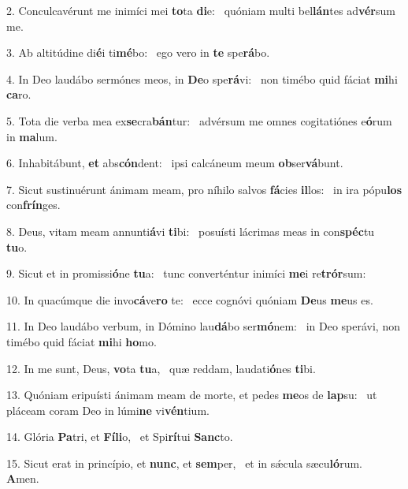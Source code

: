 2. Conculcavérunt me inimíci mei \textbf{to}ta \textbf{di}e: \ast\  quóniam multi bel\textbf{lán}tes ad\textbf{vér}sum me.\

3. Ab altitúdine di\textbf{é}i ti\textbf{mé}bo: \ast\  ego vero in \textbf{te} spe\textbf{rá}bo.\

4. In Deo laudábo sermónes meos, in \textbf{De}o spe\textbf{rá}vi: \ast\  non timébo quid fáciat \textbf{mi}hi \textbf{ca}ro.\

5. Tota die verba mea ex\textbf{se}cra\textbf{bán}tur: \ast\  advérsum me omnes cogitatiónes e\textbf{ó}rum in \textbf{ma}lum.\

6. Inhabitábunt, \textbf{et} abs\textbf{cón}dent: \ast\  ipsi calcáneum meum \textbf{ob}ser\textbf{vá}bunt.\

7. Sicut sustinuérunt ánimam meam, pro níhilo salvos \textbf{fá}cies \textbf{il}los: \ast\  in ira pópu\textbf{los} con\textbf{frín}ges.\

8. Deus, vitam meam annunti\textbf{á}vi \textbf{ti}bi: \ast\  posuísti lácrimas meas in con\textbf{spéc}tu \textbf{tu}o.\

9. Sicut et in promissi\textbf{ó}ne \textbf{tu}a: \ast\  tunc converténtur inimíci \textbf{me}i re\textbf{trór}sum:\

10. In quacúmque die invo\textbf{cá}ve\textbf{ro} te: \ast\  ecce cognóvi quóniam \textbf{De}us \textbf{me}us es.\

11. In Deo laudábo verbum, in Dómino lau\textbf{dá}bo ser\textbf{mó}nem: \ast\  in Deo sperávi, non timébo quid fáciat \textbf{mi}hi \textbf{ho}mo.\

12. In me sunt, Deus, \textbf{vo}ta \textbf{tu}a, \ast\  quæ reddam, laudati\textbf{ó}nes \textbf{ti}bi.\

13. Quóniam eripuísti ánimam meam de morte, et pedes \textbf{me}os de \textbf{lap}su: \ast\  ut pláceam coram Deo in lúmi\textbf{ne} vi\textbf{vén}tium.\

14. Glória \textbf{Pa}tri, et \textbf{Fí}\textbf{li}o, \ast\  et Spi\textbf{rí}tui \textbf{Sanc}to.\

15. Sicut erat in princípio, et \textbf{nunc}, et \textbf{sem}per, \ast\  et in sǽcula sæcu\textbf{ló}rum. \textbf{A}men.\

